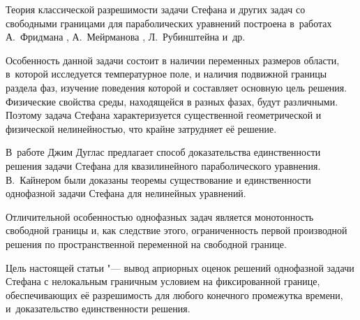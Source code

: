 


\date{10/VII/2011}

\maketitle




Теория классической разрешимости задачи Стефана и других задач со
свободными границами для параболических уравнений построена в~работах А.~Фридмана \cite{takh:bib:2}, А.~Мейрманова \cite{takh:bib:3}, Л.~Рубинштейна \cite{takh:bib:1} и~др.

Особенность данной задачи состоит в наличии переменных размеров области, в~которой исследуется температурное поле, и наличия подвижной границы раздела фаз, изучение поведения которой и составляет основную цель решения. Физические свойства среды, находящейся в разных фазах, будут различными. Поэтому задача Стефана характеризуется существенной геометрической и физической
нелинейностью, что крайне затрудняет её решение.

В~работе \cite{takh:bib:4} Джим Дуглас  предлагает способ доказательства
единственности решения задачи Стефана для квазилинейного
параболического уравнения. В.~Кайнером \cite{takh:bib:5} были доказаны
теоремы существование и единственности однофазной задачи Стефана для нелинейных уравнений.

Отличительной особенностью однофазных задач является монотонность
свободной границы и, как следствие этого, ограниченность первой
производной решения по пространственной переменной на свободной
границе.

Цель настоящей статьи "--- вывод априорных оценок решений однофазной задачи Стефана с нелокальным  граничным условием на фиксированной границе, обеспечивающих её разрешимость для любого конечного промежутка времени, и~доказательство единственности решения.

